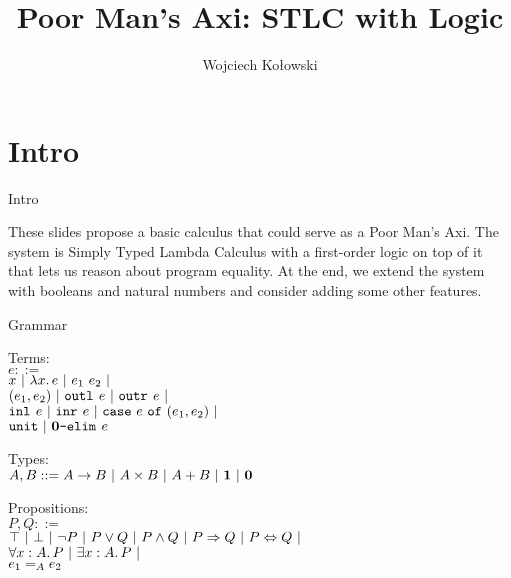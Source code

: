\documentclass{beamer}
\title{Poor Man's Axi: STLC with Logic}
\author{Wojciech Kołowski}
\date{}
\begin{document}
\frame{\titlepage}

\section{Intro}

\begin{frame}{Intro}

These slides propose a basic calculus that could serve as a Poor Man's Axi. The system is Simply Typed Lambda Calculus with a first-order logic on top of it that lets us reason about program equality. At the end, we extend the system with booleans and natural numbers and consider adding some other features.

\end{frame}

\begin{frame}{Grammar}

Terms: \\
$e ::=$ \\
\qquad $x \pipe \fun{x}{e} \pipe \app{e_1}{e_2} \pipe$ \\
\qquad $\pair{e_1}{e_2} \pipe \outl{e} \pipe \outr{e} \pipe$ \\
\qquad $\inl{e} \pipe \inr{e} \pipe \case{e}{e_1}{e_2} \pipe$ \\
\qquad $\unit \pipe \emptyelim{e}$

\vspace{1em}

Types: \\
$A, B ::= \Fun{A}{B} \pipe \Prod{A}{B} \pipe \Sum{A}{B} \pipe \Unit \pipe \Empty$

\vspace{1em}

Propositions: \\
$P, Q ::=$ \\
\qquad $\True \pipe \False \pipe \Not{P} \pipe \Or{P}{Q} \pipe \And{P}{Q} \pipe \Impl{P}{Q} \pipe \Iff{P}{Q} \pipe$ \\
\qquad $\All{x}[A]{P} \pipe \Ex{x}[A]{P} \pipe$ \\
\qquad $\Eq[A]{e_1}{e_2}$

\end{frame}
\end{document}
